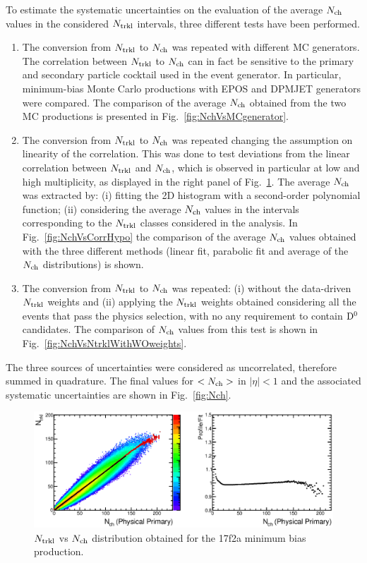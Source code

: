 To estimate the systematic uncertainties on the evaluation of the average 
$N_{\rm ch}$ values in the considered $N_{\rm trkl}$ intervals, three different tests have been performed.
\begin{enumerate}
\item The conversion from $N_{\rm trkl}$ to $N_{\rm ch}$ was repeated with different MC generators. The correlation
between $N_{\rm trkl}$ to $N_{\rm ch}$ can in fact be sensitive to the primary and secondary particle cocktail used in the event generator.
In particular, minimum-bias Monte Carlo 
productions with EPOS and DPMJET generators were compared.
The comparison of the average $N_{\rm ch}$ obtained from the two MC productions
is presented in Fig.~\ref{fig:NchVsMCgenerator}.
\item The conversion from $N_{\rm trkl}$ to $N_{\rm ch}$ was repeated changing the 
assumption on linearity of the correlation. This was done to test deviations from 
the linear correlation between $N_{\rm trkl}$ and $N_{\rm ch}$, which is  
observed in particular at low and high multiplicity, as displayed in the right panel of Fig.~\ref{fig:NtrklVsNch}.  
The average $N_{\rm ch}$ was extracted by: (i) fitting the 2D histogram with a second-order polynomial 
function; (ii) considering the average $N_{\rm ch}$ values in the intervals corresponding to the $N_{\rm trkl}$ 
classes considered in the analysis.
In Fig.~\ref{fig:NchVsCorrHypo} the comparison of the average $N_{\rm ch}$ values
obtained with the three different methods (linear fit, parabolic fit and average of the $N_{\rm ch}$ distributions) is shown.
\item The conversion from $N_{\rm trkl}$ to $N_{\rm ch}$ was repeated: (i) without the data-driven 
$N_{\rm trkl}$ weights and (ii) applying the $N_{\rm trkl}$ weights obtained considering all 
the events that pass the physics selection, with no any requirement to contain 
${\rm D^0}$ candidates. The comparison of $N_{\rm ch}$ values from this test is shown in Fig.~\ref{fig:NchVsNtrklWithWOweights}.
\end{enumerate}
The three sources of uncertainties were considered as 
uncorrelated, therefore summed in quadrature. The final values for $<N_{\rm ch}>$ in $|\eta|<1$ 
and the associated systematic uncertainties are shown in 
Fig.~\ref{fig:Nch}.

\begin{figure}[h]
\centering
 \includegraphics[width=1.\textwidth]{FigCap6/NtrklVsNchPhysPrimWithNtrklsReweight17f2a.eps}
 \caption{$N_{\rm trkl}$ vs $N_{\rm ch}$ distribution obtained for the 17f2a minimum bias production.}
 \label{fig:NtrklVsNch}
\end{figure}

